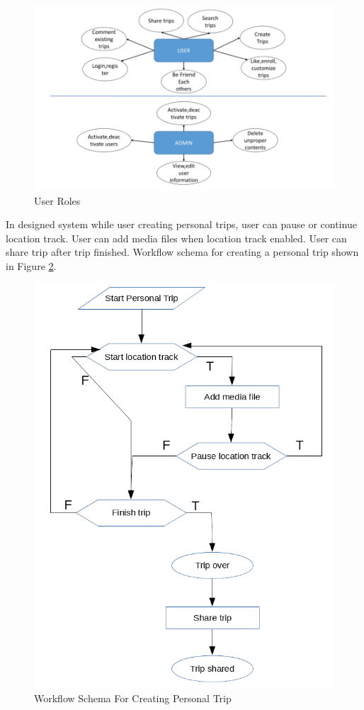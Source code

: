 \begin{figure}[!htbp]
\centering
\includegraphics[width=\textwidth]{projectChapters/images/ER.png}
\caption{User Roles}
\label{fig:roles}
\end{figure}
\newpage
In designed system while user creating personal trips, user can pause or continue location track. User can add media files when location track enabled. User can share trip after trip finished. Workflow schema for creating a personal trip shown in Figure \ref{fig:personalTripWorkflow}. 

\begin{figure}[!htbp]
\centering
\includegraphics[width=\textwidth]{projectChapters/images/personalTripWorkflow.png}
\caption{Workflow Schema For Creating Personal Trip}
\label{fig:personalTripWorkflow}
\end{figure}

